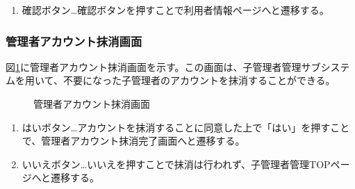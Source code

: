 \documentclass[a4j]{jarticle}
\begin{document}
\begin{enumerate}
  \renewcommand{\labelenumi}{\textcircled{\scriptsize \theenumi}}

\item 確認ボタン…確認ボタンを押すことで利用者情報ページへと遷移する。

\end{enumerate}




\subsubsection{管理者アカウント抹消画面}
図\ref{fig:delete_admin}に管理者アカウント抹消画面を示す。この画面は、子管理者管理サブシステムを用いて、不要になった子管理者のアカウントを抹消することができる。
\begin{figure}[H]
\begin{center}
\caption{管理者アカウント抹消画面}
\label{fig:delete_admin}
\end{center}
\end{figure}
\begin{enumerate}
  \renewcommand{\labelenumi}{\textcircled{\scriptsize \theenumi}}

\item はいボタン…アカウントを抹消することに同意した上で「はい」を押すことで、管理者アカウント抹消完了画面へと遷移する。

\item いいえボタン…いいえを押すことで抹消は行われず、子管理者管理TOPページへと遷移する。
\end{enumerate}
\end{document}
